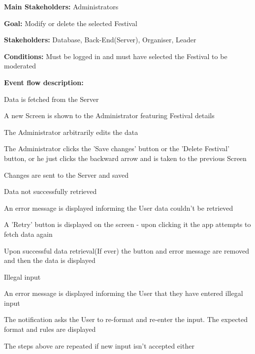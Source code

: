				\noindent {}
				\begin{packed_item}
					\item \textbf{Main Stakeholders:} Administrators
					\item \textbf{Goal:} Modify or delete the selected Festival
					\item \textbf{Stakeholders: } Database, Back-End(Server), Organiser, Leader
					\item \textbf{Conditions: } Must be logged in and must have selected the Festival to be moderated
					\item \textbf{Event flow description: }
					\begin{packed_enum}
						\item Data is fetched from the Server
						\item A new Screen is shown to the Administrator featuring Festival details
						\item The Administrator arbitrarily edits the data
						\item The Administrator clicks the 'Save changes' button or the 'Delete Festival' button, or he just clicks the backward arrow and is taken to the previous Screen
						\item Changes are sent to the Server and saved
					\end{packed_enum}
					
					\begin{packed_item}
						\item[1.a] Data not successfully retrieved
						\item[] \begin{packed_enum}
							\item An error message is displayed informing the User data couldn't be retrieved
							\item A 'Retry' button is displayed on the screen - upon clicking it the app attempts to fetch data again
							\item Upon successful data retrieval(If ever) the button and error message are removed and then the data is displayed
						\end{packed_enum}
					
						\item[3.a] Illegal input
						\item[] \begin{packed_enum}
							\item An error message is displayed informing the User that they have entered illegal input
							\item The notification asks the User to re-format and re-enter the input. The expected format and rules are displayed
							\item The steps above are repeated if new input isn't accepted either
						\end{packed_enum}
						

\end{packed_item}
\end{packed_item}
